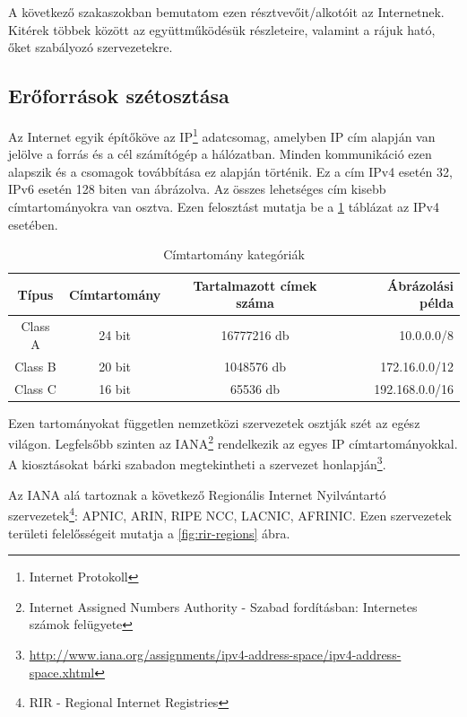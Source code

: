 A következő szakaszokban bemutatom ezen résztvevőit/alkotóit az Internetnek. Kitérek többek között az együttműködésük részleteire, valamint a rájuk ható, őket szabályozó szervezetekre.

\subsection{Erőforrások szétosztása\label{eroforrasok}}
Az Internet egyik építőköve az IP\footnote{Internet Protokoll} adatcsomag, amelyben IP cím alapján van jelölve a forrás és a cél számítógép a hálózatban. Minden kommunikáció ezen alapszik és a csomagok továbbítása ez alapján történik. Ez a cím IPv4 esetén 32, IPv6 esetén 128 biten van ábrázolva. Az összes lehetséges cím kisebb címtartományokra van osztva. Ezen felosztást mutatja be a \ref{tab:cimtartomanyok} táblázat az IPv4 esetében.

\begin{table}[ht]
	\centering
	\caption{Címtartomány kategóriák}
	\hspace{2mm}
	\begin{tabular}{ | c | c | c | r |}
	\hline
	Típus & Címtartomány & Tartalmazott címek száma & Ábrázolási példa \\ \hline

Class A & 24 bit & 16777216 db & 10.0.0.0/8\\ \hline
Class B & 20 bit & 1048576 db & 172.16.0.0/12\\ \hline
Class C & 16 bit & 65536 db & 192.168.0.0/16\\ \hline
	\end{tabular}
	\label{tab:cimtartomanyok}
\end{table}


Ezen tartományokat független nemzetközi szervezetek osztják szét az egész világon. Legfelsőbb szinten az IANA\footnote{Internet Assigned Numbers Authority - Szabad fordításban: Internetes számok felügyete} rendelkezik az egyes IP címtartományokkal. A kiosztásokat bárki szabadon megtekintheti a szervezet honlapján\footnote{\url{http://www.iana.org/assignments/ipv4-address-space/ipv4-address-space.xhtml}}.

Az IANA alá tartoznak a következő Regionális Internet Nyilvántartó szervezetek\footnote{RIR - Regional Internet Registries}: APNIC, ARIN, RIPE NCC, LACNIC, AFRINIC.
Ezen szervezetek területi felelősségeit mutatja a \ref{fig:rir-regions} ábra.

